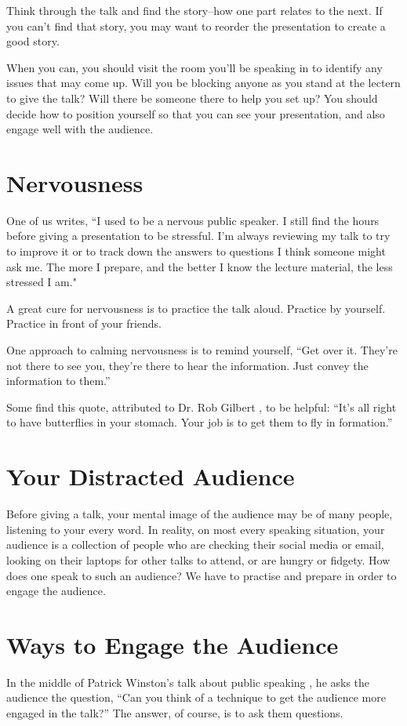 Think through the talk and find the story--how one part relates to the next.  If you can't find that story, you may want to reorder the presentation to create a good story.

When you can, you should visit the room you'll be speaking in to identify any issues that may come up.  Will you be blocking anyone as you stand at the lectern to give the talk?  Will there be someone there to help you set up?  You should decide how to position yourself so that you can see your presentation, and also engage well with the audience.


\section{Nervousness}

One of us writes, ``I used to be a nervous public speaker.  I still find the hours before giving a presentation to be stressful. I'm always reviewing my talk to try to improve it or to track down the answers to questions I think someone might ask me.  The more I prepare, and the better I know the lecture material, the less stressed I am."

A great cure for nervousness is to practice the talk aloud. Practice by yourself.  Practice in front of your friends.

One approach \cite{Hoogterp} to calming  nervousness is to remind yourself,
``Get over it.  They’re not there to see you, they’re there to hear the information.  Just convey the information to them.''

Some find this quote, attributed to Dr. Rob Gilbert \cite{Gilbert}, to be helpful:
``It's all right to have butterflies in your stomach. Your job is to get them to fly in formation.''

\section{Your Distracted Audience}
Before giving a talk, your mental image of the audience may be of many people, listening to your every word.  In reality, on most every speaking situation, your audience is a collection of people who are checking their social media or email, looking on their laptops for other talks to attend, or are hungry or fidgety.  How does one speak to such an audience?  We have to practise and prepare in order to engage the audience.



\section{Ways to Engage the Audience}
In the middle of Patrick Winston's talk about public speaking \cite{WinstonSpeaks}, he asks the audience the question, ``Can you think of a technique to get the audience more engaged in the talk?''  The answer, of course, is to ask them questions.


